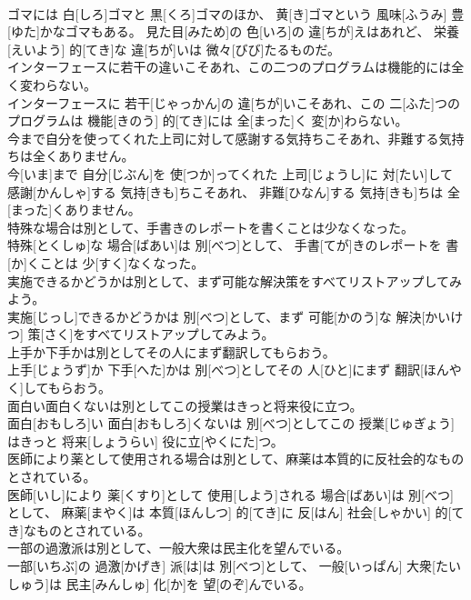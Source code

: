 \documentclass[8pt]{extreport}
\begin{document}
\begin{CJK}{UTF8}{min}
\\	ゴマには 白[しろ]ゴマと 黒[くろ]ゴマのほか、 黄[き]ゴマという 風味[ふうみ] 豊[ゆた]かなゴマもある。 見た目[みため]の 色[いろ]の 違[ちが]えはあれど、 栄養[えいよう] 的[てき]な 違[ちが]いは 微々[びび]たるものだ。
\\	インターフェースに若干の違いこそあれ、この二つのプログラムは機能的には全く変わらない。	
\\	インターフェースに 若干[じゃっかん]の 違[ちが]いこそあれ、この 二[ふた]つのプログラムは 機能[きのう] 的[てき]には 全[まった]く 変[か]わらない。
\\	今まで自分を使ってくれた上司に対して感謝する気持ちこそあれ、非難する気持ちは全くありません。	
\\	今[いま]まで 自分[じぶん]を 使[つか]ってくれた 上司[じょうし]に 対[たい]して 感謝[かんしゃ]する 気持[きも]ちこそあれ、 非難[ひなん]する 気持[きも]ちは 全[まった]くありません。
\\	特殊な場合は別として、手書きのレポートを書くことは少なくなった。	
\\	特殊[とくしゅ]な 場合[ばあい]は 別[べつ]として、 手書[てが]きのレポートを 書[か]くことは 少[すく]なくなった。
\\	実施できるかどうかは別として、まず可能な解決策をすべてリストアップしてみよう。	
\\	実施[じっし]できるかどうかは 別[べつ]として、まず 可能[かのう]な 解決[かいけつ] 策[さく]をすべてリストアップしてみよう。
\\	上手か下手かは別としてその人にまず翻訳してもらおう。	
\\	上手[じょうず]か 下手[へた]かは 別[べつ]としてその 人[ひと]にまず 翻訳[ほんやく]してもらおう。
\\	面白い面白くないは別としてこの授業はきっと将来役に立つ。	
\\	面白[おもしろ]い 面白[おもしろ]くないは 別[べつ]としてこの 授業[じゅぎょう]はきっと 将来[しょうらい] 役に立[やくにた]つ。
\\	医師により薬として使用される場合は別として、麻薬は本質的に反社会的なものとされている。	
\\	医師[いし]により 薬[くすり]として 使用[しよう]される 場合[ばあい]は 別[べつ]として、 麻薬[まやく]は 本質[ほんしつ] 的[てき]に 反[はん] 社会[しゃかい] 的[てき]なものとされている。
\\	一部の過激派は別として、一般大衆は民主化を望んでいる。	
\\	一部[いちぶ]の 過激[かげき] 派[は]は 別[べつ]として、 一般[いっぱん] 大衆[たいしゅう]は 民主[みんしゅ] 化[か]を 望[のぞ]んでいる。

\end{CJK}
\end{document}
